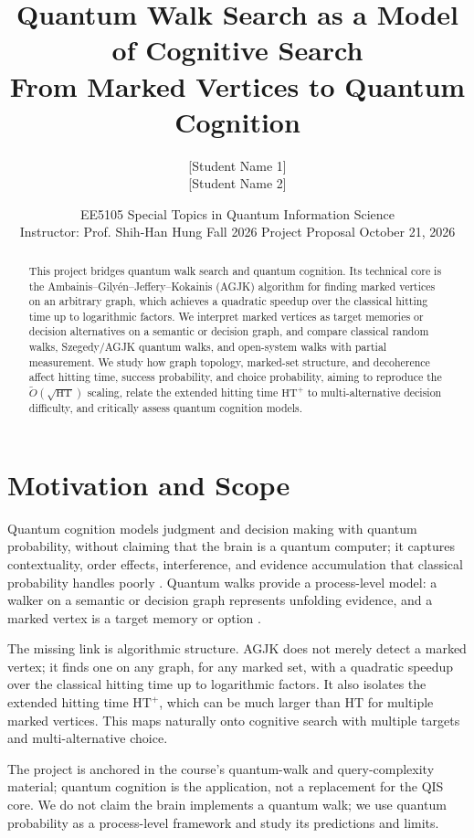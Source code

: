 \documentclass[10pt]{article}
\title{\vspace{-2.2em}Quantum Walk Search as a Model of Cognitive Search\\[0.25em]
\large From Marked Vertices to Quantum Cognition}
\author{[Student Name 1] \quad [Student ID 1]\\[0.2em]
[Student Name 2] \quad [Student ID 2]}
\date{EE5105 Special Topics in Quantum Information Science\\
Instructor: Prof. Shih-Han Hung \quad Fall 2026 \quad Project Proposal \quad October 21, 2026}
\newcommand{\HT}{\mathrm{HT}}
\newcommand{\HTp}{\mathrm{HT}^{+}}
\newcommand{\Otil}{\widetilde{O}}
\begin{document}
\maketitle
\vspace{-1.4em}

\begin{abstract}
\noindent
This project bridges quantum walk search and quantum cognition. Its technical core is the Ambainis--Gily\'en--Jeffery--Kokainis (AGJK) algorithm for finding marked vertices on an arbitrary graph, which achieves a quadratic speedup over the classical hitting time up to logarithmic factors. We interpret marked vertices as target memories or decision alternatives on a semantic or decision graph, and compare classical random walks, Szegedy/AGJK quantum walks, and open-system walks with partial measurement. We study how graph topology, marked-set structure, and decoherence affect hitting time, success probability, and choice probability, aiming to reproduce the $\Otil(\sqrt{\HT})$ scaling, relate the extended hitting time $\HTp$ to multi-alternative decision difficulty, and critically assess quantum cognition models.
\end{abstract}

\section{Motivation and Scope}

Quantum cognition models judgment and decision making with quantum probability, without claiming that the brain is a quantum computer; it captures contextuality, order effects, interference, and evidence accumulation that classical probability handles poorly \cite{pothos2022,busemeyer2024}. Quantum walks provide a process-level model: a walker on a semantic or decision graph represents unfolding evidence, and a marked vertex is a target memory or option \cite{chen2022,huang2022,pavone2025}.

The missing link is algorithmic structure. AGJK \cite{agjk2019} does not merely detect a marked vertex; it finds one on any graph, for any marked set, with a quadratic speedup over the classical hitting time up to logarithmic factors. It also isolates the extended hitting time $\HTp$, which can be much larger than $\HT$ for multiple marked vertices. This maps naturally onto cognitive search with multiple targets and multi-alternative choice.

The project is anchored in the course's quantum-walk and query-complexity material; quantum cognition is the application, not a replacement for the QIS core. We do not claim the brain implements a quantum walk; we use quantum probability as a process-level framework and study its predictions and limits.
\end{document}
